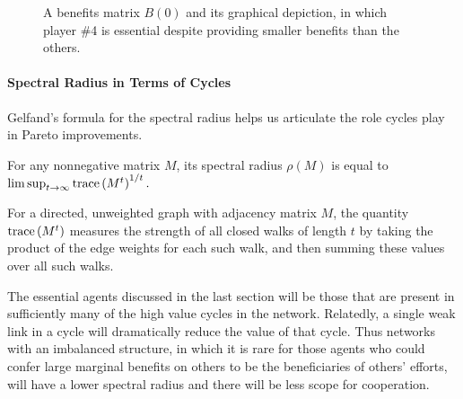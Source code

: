 \documentclass{notices}
\theoremstyle{definition}\newtheorem{problem}{Problem}
\begin{document}
\begin{figure}[t]
\centering
{}
\caption{A benefits matrix ${B}({0})$ and its graphical depiction, in which player \#4 is essential despite providing smaller benefits than the others.}
\label{fig:three-cycle-2}
\end{figure}


\paragraph{Spectral Radius in Terms of Cycles}


Gelfand's formula for the spectral radius helps us articulate the role cycles play in Pareto improvements.


\begin{fact}\label{fact:cycles}\label{fact:monotonic}
For any nonnegative matrix ${M}$, its spectral radius $\rho({M})$ is equal to $ \limsup_{t \to \infty} \operatorname{trace} \left({M}^t\right)^{1/t} .$


\end{fact}


For a directed, unweighted graph with adjacency matrix ${M}$, the quantity $\operatorname{trace} \left({M}^t\right)$  measures the strength of all closed walks of length $t$ by taking the product of the edge weights for each such walk, and then summing these values over all such walks.

The essential agents discussed in the last section will be those that are present in sufficiently many of the high value cycles in the network. Relatedly, a single weak link in a cycle will dramatically reduce the value of that cycle. Thus networks with an imbalanced structure, in which it is rare for those agents who could confer large marginal benefits on others to be the beneficiaries of others' efforts, will have a lower spectral radius and there will be less scope for cooperation.
\end{document}
